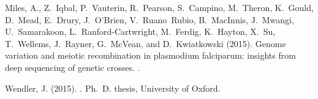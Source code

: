 \begin{thebibliography}{}


Miles, A., Z.~Iqbal, P.~Vauterin, R.~Pearson, S.~Campino, M.~Theron, K.~Gould,
  D.~Mead, E.~Drury, J.~O{\textquoteright}Brien, V.~Ruano~Rubio, B.~MacInnis,
  J.~Mwangi, U.~Samarakoon, L.~Ranford-Cartwright, M.~Ferdig, K.~Hayton, X.~Su,
  T.~Wellems, J.~Rayner, G.~McVean, and D.~Kwiatkowski (2015).
\newblock Genome variation and meiotic recombination in plasmodium falciparum:
  insights from deep sequencing of genetic crosses.
.

Wendler, J. (2015).
.
\newblock Ph.\ D. thesis, University of Oxford.

\end{thebibliography}
